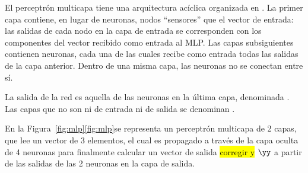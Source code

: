 El perceptrón multicapa tiene una arquitectura acíclica organizada en
.  La primer capa contiene, en lugar de neuronas, nodos
``sensores'' que  el vector de entrada: las salidas de cada
nodo en la capa de entrada se corresponden con los componentes del
vector recibido como entrada al MLP.  Las capas subsiguientes
contienen neuronas, cada una de las cuales recibe como entrada todas
las salidas de la capa anterior.  Dentro de una misma capa, las
neuronas no se conectan entre sí.

La salida de la red es aquella de las neuronas en la última capa,
denominada . Las capas que no son ni de entrada ni de
salida se denominan .

En la \iflatexml{}Figura~\ref{fig:mlp}\else\autoref{fig:mlp}\fi se
representa un perceptrón multicapa de 2 capas, que lee un vector de 3
elementos, el cual es propagado a través de la capa oculta de 4
neuronas para finalmente calcular un vector de salida \hl{corregir y}
$\yy$ a partir de las salidas de las 2 neuronas en la capa de salida.

